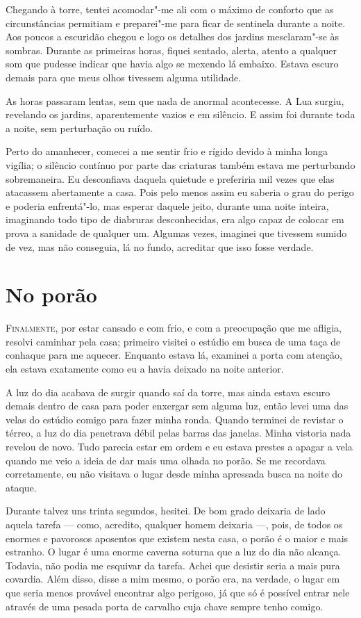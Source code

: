 Chegando à torre, tentei acomodar"-me ali com o máximo de conforto que as circunstâncias permitiam e preparei"-me para
ficar de sentinela durante a noite. Aos poucos a escuridão chegou e logo os detalhes dos jardins mesclaram"-se às
sombras. Durante as primeiras horas, fiquei sentado, alerta, atento a qualquer som que pudesse indicar que havia algo
se mexendo lá embaixo. Estava escuro demais para que meus olhos tivessem alguma utilidade.

As horas passaram lentas, sem que nada de anormal acontecesse. A Lua surgiu, revelando os jardins, aparentemente
vazios e em silêncio. E assim foi durante toda a noite, sem perturbação ou ruído.

Perto do amanhecer, comecei a me sentir frio e rígido devido à minha longa vigília; o silêncio contínuo por parte das
criaturas também estava me perturbando sobremaneira. Eu desconfiava daquela quietude e preferiria mil vezes que elas
atacassem abertamente a casa. Pois pelo menos assim eu saberia o grau do perigo e poderia enfrentá"-lo, mas esperar
daquele jeito, durante uma noite inteira, imaginando todo tipo de diabruras desconhecidas, era algo capaz de colocar em
prova a sanidade de qualquer um. Algumas vezes, imaginei que tivessem sumido de vez, mas não conseguia, lá no fundo,
acreditar que isso fosse verdade.


\clearpage

\chapter{No porão}

\textsc{Finalmente,} por estar cansado e com frio, e com a preocupação que me afligia, resolvi caminhar pela casa; primeiro
visitei o estúdio em busca de uma taça de conhaque para me aquecer. Enquanto estava lá, examinei a porta
com atenção, ela estava exatamente como eu a havia deixado na noite anterior.

A luz do dia acabava de surgir quando saí da torre, mas ainda estava escuro demais dentro de casa para poder enxergar
sem alguma luz, então levei uma das velas do estúdio comigo para fazer minha ronda. Quando terminei de revistar o
térreo, a luz do dia penetrava débil pelas barras das janelas. Minha vistoria nada revelou de novo. Tudo parecia
estar em ordem e eu estava prestes a apagar a vela quando me veio a ideia de dar mais uma olhada no porão. Se me
recordava corretamente, eu não visitava o lugar desde minha apressada busca na noite do ataque.

Durante talvez uns trinta segundos, hesitei. De bom grado deixaria de lado aquela tarefa --- como, acredito, qualquer
homem deixaria ---, pois, de todos os enormes e pavorosos aposentos que existem nesta casa, o porão é o maior e mais
estranho. O lugar é uma enorme caverna soturna que a luz do dia não alcança. Todavia, não podia me esquivar da tarefa.
Achei que desistir seria a mais pura covardia. Além disso, disse a mim mesmo, o porão era, na verdade, o lugar em que
seria menos provável encontrar algo perigoso, já que só é possível entrar nele através de uma pesada porta de carvalho
cuja chave sempre tenho comigo.

